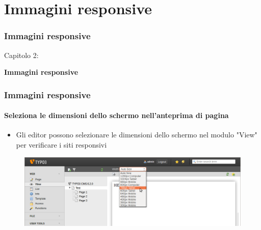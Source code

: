 %

\section{Immagini responsive}
\begin{frame}[fragile]
	\frametitle{Immagini responsive}

	\begin{center}\huge{Capitolo 2:}\end{center}
	\begin{center}\huge{\color{typo3darkgrey}\textbf{Immagini responsive}}\end{center}

\end{frame}


\begin{frame}[fragile]
	\frametitle{Immagini responsive}
	\framesubtitle{Seleziona le dimensioni dello schermo nell'anteprima di pagina}

	\begin{itemize}
		\item Gli editor possono selezionare le dimensioni dello schermo nel modulo "View" per verificare i siti responsivi
	\end{itemize}

	\begin{figure}
		\includegraphics[width=0.95\linewidth]{Images/ResponsiveImages/ScreenSizeInPagePreview.png}
	\end{figure}

\end{frame}

